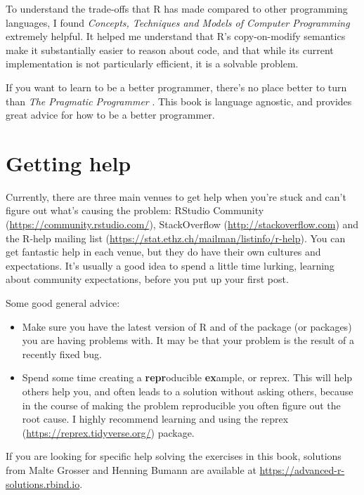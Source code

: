 \documentclass[
]{book}
\renewcommand{\href}[2]{#2 (\url{#1})}
\begin{document}
To understand the trade-offs that R has made compared to other programming languages, I found \emph{Concepts, Techniques and Models of Computer Programming} \citep{ctmcp} extremely helpful. It helped me understand that R's copy-on-modify semantics make it substantially easier to reason about code, and that while its current implementation is not particularly efficient, it is a solvable problem.

If you want to learn to be a better programmer, there's no place better to turn than \emph{The Pragmatic Programmer} \citep{pragprog}. This book is language agnostic, and provides great advice for how to be a better programmer.

\hypertarget{getting-help}{%
\section{Getting help}\label{getting-help}}


Currently, there are three main venues to get help when you're stuck and can't figure out what's causing the problem: \href{https://community.rstudio.com/}{RStudio Community}, \href{http://stackoverflow.com}{StackOverflow} and the \href{https://stat.ethz.ch/mailman/listinfo/r-help}{R-help mailing list}. You can get fantastic help in each venue, but they do have their own cultures and expectations. It's usually a good idea to spend a little time lurking, learning about community expectations, before you put up your first post.

Some good general advice:

\begin{itemize}
\item
  Make sure you have the latest version of R and of the package (or packages)
  you are having problems with. It may be that your problem is the result of
  a recently fixed bug.
\item
  Spend some time creating a \textbf{repr}oducible \textbf{ex}ample, or reprex.
  This will help others help you, and often leads to a solution without
  asking others, because in the course of making the problem reproducible you
  often figure out the root cause. I highly recommend learning and using
  the \href{https://reprex.tidyverse.org/}{reprex} package.
\end{itemize}

If you are looking for specific help solving the exercises in this book, solutions from Malte Grosser and Henning Bumann are available at \url{https://advanced-r-solutions.rbind.io}.
\end{document}
